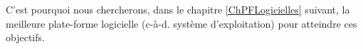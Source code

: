 C'est pourquoi nous chercherons, dans le chapitre \ref{ChPFLogicielles}
suivant, la meilleure plate-forme logicielle (c-à-d. système d'exploitation)
pour atteindre ces objectifs.




